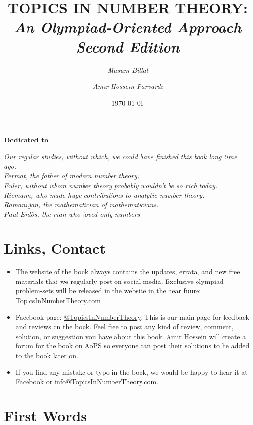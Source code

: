 \documentclass[12pt]{book}
\title{\bf TOPICS IN NUMBER THEORY:\\ \it An Olympiad-Oriented Approach\\Second Edition}
\author{
	\it Masum Billal%
	\and
	\it Amir Hossein Parvardi%
}
\date{\today}
\begin{document}
\frontmatter
\maketitle
\pagestyle{plain}

\begin{dedication}
	\begin{center}
		\textbf{Dedicated to}
	\end{center}\slshape
	Our regular studies, without which, we could have finished this book long time ago.\\
	Fermat, the father of modern number theory.\\
	Euler, without whom number theory probably wouldn't be so rich today.\\
	Riemann, who made huge contributions to analytic number theory.\\
	Ramanujan, the mathematician of mathematicians.\\
	Paul Erd\"{o}s, the man who loved only numbers.
\end{dedication}

\section*{Links, Contact}

\begin{itemize}
	\item The website of the book always contains the updates, errata, and new free materials that we regularly post on social media. Exclusive olympiad problem-sets will be released in the website in the near fuure: \url{TopicsInNumberTheory.com}
	\item Facebook page: \url{@TopicsInNumberTheory}. This is our main page for feedback and reviews on the book. Feel free to post any kind of review, comment, solution, or suggestion you have about this book. Amir Hossein will create a forum for the book on AoPS so everyone can post their solutions to be added to the book later on.
	\item If you find any mistake or typo in the book, we would be happy to hear it at Facebook or \url{info@TopicsInNumberTheory.com}.
\end{itemize}

\newpage
\section*{First Words}
\end{document}

